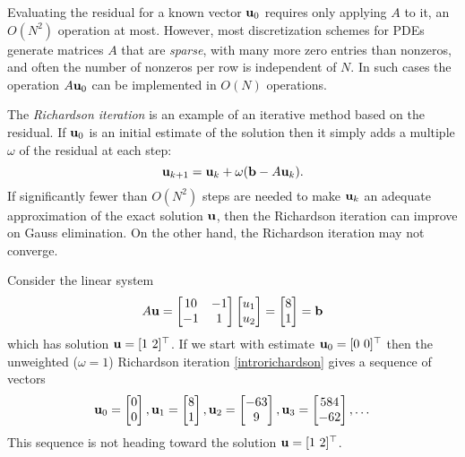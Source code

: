 Evaluating the residual for a known vector $\mathbf{u}_0$ requires only applying $A$ to it, an $O(N^2)$ operation at most.  However, most discretization schemes for PDEs generate matrices $A$ that are \emph{sparse}, with many more zero entries than nonzeros, and often the number of nonzeros per row is independent of $N$.  In such cases the operation $A\mathbf{u}_0$ can be implemented in $O(N)$ operations.

The \emph{Richardson iteration} is an example of an iterative method based on the residual.  If $\mathbf{u}_0$ is an initial estimate of the solution then it simply adds a multiple $\omega$ of the residual at each step:
\begin{equation}
\mathbf{u}_{k+1} = \mathbf{u}_k + \omega (\mathbf{b} - A \mathbf{u}_k).  \label{introrichardson}
\end{equation}
If significantly fewer than $O(N^2)$ steps are needed to make $\mathbf{u}_k$ an adequate approximation of the exact solution $\mathbf{u}$, then the Richardson iteration can improve on Gauss elimination.  On the other hand, the Richardson iteration may not converge.

\newcommand{\rvect}[3]{\ensuremath{\bu_{#1} = \begin{bmatrix} #2 \\ #3 \end{bmatrix}}}

\medskip\noindent\hrulefill
\begin{example} Consider the linear system
\begin{equation}
A \mathbf{u}
= \begin{bmatrix}
10 & -1 \\ -1 & 1
\end{bmatrix}
\begin{bmatrix} u_1 \\ u_2 \end{bmatrix}
= \begin{bmatrix} 8 \\ 1 \end{bmatrix}
= \mathbf{b}
 \label{introexample}
\end{equation}
which has solution $\mathbf{u} = [1\,\, 2]^\top$.  If we start with estimate $\mathbf{u}_0 = [0\,\, 0]^\top$ then the unweighted ($\omega=1$) Richardson iteration \eqref{introrichardson} gives a sequence of vectors %
\begin{equation}
\rvect{0}{0}{0}, \rvect{1}{8}{1}, \rvect{2}{-63}{9}, \rvect{3}{584}{-62}, \dots
\end{equation}
This sequence is not heading toward the solution $\mathbf{u} = [1\,\, 2]^\top$.
\end{example}
\noindent\hrulefill

